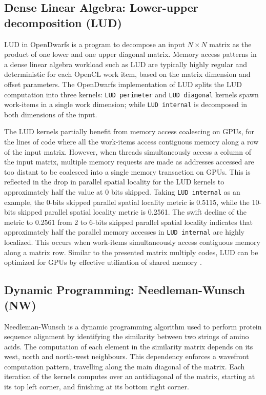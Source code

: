 \documentclass[review=false, sigchi]{acmart}
\begin{document}
	\subsection{Dense Linear Algebra: Lower-upper decomposition (LUD)}
	
	LUD in OpenDwarfs is a program to decompose an input $N\times N$ matrix as the product of one lower and one upper diagonal matrix. 
	Memory access patterns in a dense linear algebra workload such as LUD are typically highly regular and deterministic for each OpenCL work item, based on the matrix dimension and offset parameters. The OpenDwarfs implementation of LUD \cite{opendwarfs2020head} splits the LUD computation into three kernels: \texttt{LUD perimeter} and \texttt{LUD diagonal} kernels spawn work-items in a single work dimension; while \texttt{LUD internal} is decomposed in both dimensions of the input.
	
	The LUD kernels partially benefit from memory access coalescing on GPUs, for the lines of code where all the work-items access contiguous memory along a row of the input matrix. 
	However, when threads simultaneously access a column of the input matrix, multiple memory requests are made as addresses accessed are too distant to be coalesced into a single memory transaction on GPUs. 
	This is reflected in the drop in parallel spatial locality for the LUD kernels to approximately half the value at 0 bits skipped. Taking \texttt{LUD internal} as an example, the 0-bits skipped parallel spatial locality metric is 0.5115, while the 10-bits skipped parallel spatial locality metric is 0.2561. 
	The swift decline of the metric to 0.2561 from 2 to 6-bits skipped parallel spatial locality indicates that approximately half the parallel memory accesses in \texttt{LUD internal} are highly localized. This occurs when work-items simultaneously access contiguous memory along a matrix row. 
	Similar to the presented matrix multiply codes, LUD can be optimized for GPUs by effective utilization of shared memory \cite{opendwarfs2020head}.
	
	\subsection{Dynamic Programming: Needleman-Wunsch (NW)}
	
	Needleman-Wunsch is a dynamic programming algorithm used to perform protein sequence alignment by identifying the similarity between two strings of amino acids.
	The computation of each element in the similarity matrix depends on its west, north and north-west neighbours.
	This dependency enforces a wavefront computation pattern, travelling along the main diagonal of the matrix. Each iteration of the kernels computes over an antidiagonal of the matrix, starting at its top left corner, and finishing at its bottom right corner.
	
\end{document}
